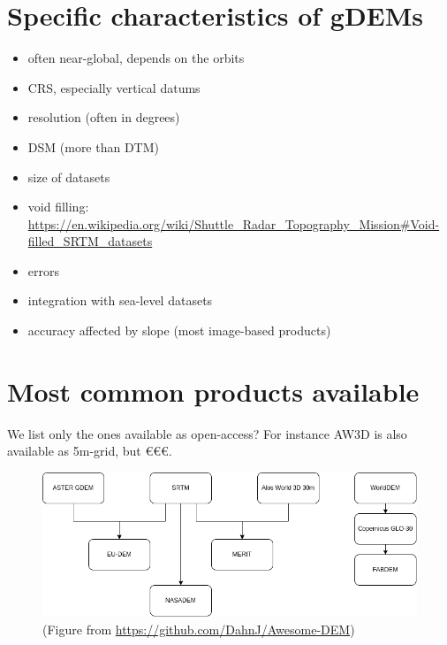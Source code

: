%
\section[Specific characteristics]{Specific characteristics of gDEMs}

\begin{itemize}
  \item often near-global, depends on the orbits
  \item CRS, especially vertical datums
  \item resolution (often in degrees)
  \item DSM (more than DTM)
  \item size of datasets
  \item void filling: \url{https://en.wikipedia.org/wiki/Shuttle_Radar_Topography_Mission#Void-filled_SRTM_datasets}
  \item errors
  \item integration with sea-level datasets
  \item accuracy affected by slope (most image-based products)
\end{itemize}


%
\section[Most common products]{Most common products available}

We list only the ones available as open-access?
For instance AW3D is also available as 5m-grid, but €€€.

\begin{figure}
  \centering
  \includegraphics[width=\linewidth]{gdem_inheritance}
  \caption{(Figure from \url{https://github.com/DahnJ/Awesome-DEM})}%
\end{figure}



